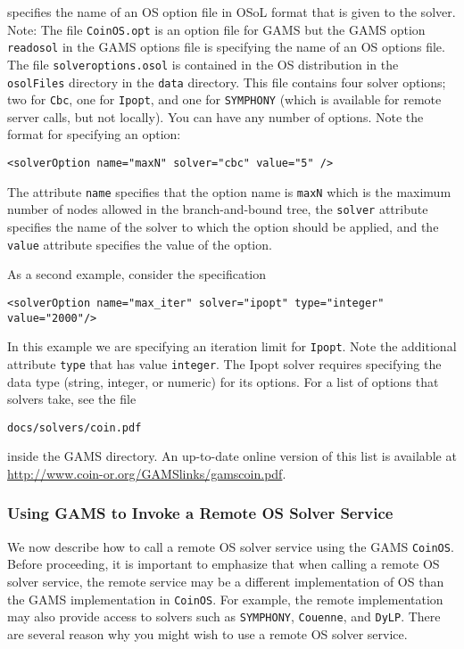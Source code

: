 \vskip 8pt
  specifies the name of an OS option  file in OSoL format that is 
given to the solver.  Note: The file  {\tt CoinOS.opt} is an option  file for GAMS but the GAMS option 
{\tt readosol} in the GAMS options file  is specifying the name of an OS options file. 
\vskip 8pt
The file {\tt solveroptions.osol} is contained in the OS distribution in the {\tt osolFiles} directory   
in the {\tt data} directory. This file contains four solver options; two for {\tt Cbc}, one for {\tt Ipopt},
and one for {\tt SYMPHONY} (which is available for remote server calls, but not locally).  
You can have any number of options. Note the format for specifying an option:
\begin{verbatim}
<solverOption name="maxN" solver="cbc" value="5" />
\end{verbatim}
The attribute {\tt name} specifies that the option name is {\tt maxN} which is the maximum number of nodes 
allowed in the branch-and-bound tree, the {\tt solver} attribute specifies the name of the solver to which
the option should be applied, and the {\tt value} attribute specifies the value of the option. 

As a second example, consider the specification
\begin{verbatim}
<solverOption name="max_iter" solver="ipopt" type="integer" value="2000"/> 
\end{verbatim}
In this example we are specifying an iteration limit for {\tt Ipopt}.  Note the additional attribute 
{\tt type} that has value  {\tt integer}. The Ipopt solver requires specifying the data type 
(string, integer, or numeric) for its options.   For a list of options that solvers take, 
see the file
\begin{verbatim}
docs/solvers/coin.pdf
\end{verbatim}
inside the GAMS directory. 
An up-to-date online version of this list is available at \url{http://www.coin-or.org/GAMSlinks/gamscoin.pdf}.



\subsubsection{Using GAMS  to Invoke a Remote OS Solver Service}\label{section:gamsremote}

We now describe how to call  a remote OS   solver service using the GAMS {\tt CoinOS}.  Before proceeding, 
it is important to emphasize that when calling a remote OS solver service, the remote service may be a 
different implementation of OS than the GAMS implementation in {\tt CoinOS}. For example, the remote 
implementation may also provide access to solvers such as {\tt SYMPHONY}, {\tt Couenne}, and {\tt DyLP}.  
There are several reason why you might wish to use a remote OS solver service. 

